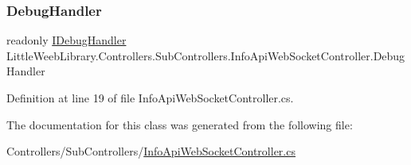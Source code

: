 \subsubsection{\texorpdfstring{Debug\+Handler}{DebugHandler}}
{\footnotesize\ttfamily readonly \mbox{\hyperlink{interface_little_weeb_library_1_1_handlers_1_1_i_debug_handler}{I\+Debug\+Handler}} Little\+Weeb\+Library.\+Controllers.\+Sub\+Controllers.\+Info\+Api\+Web\+Socket\+Controller.\+Debug\+Handler\hspace{0.3cm}{\ttfamily [private]}}



Definition at line 19 of file Info\+Api\+Web\+Socket\+Controller.\+cs.



The documentation for this class was generated from the following file\+:\begin{DoxyCompactItemize}
\item 
Controllers/\+Sub\+Controllers/\mbox{\hyperlink{_info_api_web_socket_controller_8cs}{Info\+Api\+Web\+Socket\+Controller.\+cs}}\end{DoxyCompactItemize}
